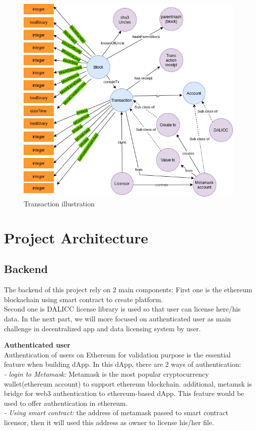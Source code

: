 \begin{itemize}
\begin{center}
\begin{figure}[htb!]
\begin{minipage}{0.75\linewidth}
			\includegraphics[width=1.45\textwidth]{images/chap03_knowledge_graph.png}
		\end{minipage}
		\caption{Transaction illustration}
		
	\end{figure}
	
\end{center}

\end{itemize}
\section{Project Architecture}
\subsection{Backend} The backend of this project rely on 2 main components: First one is the ethereum blockachain using smart contract to create platform. \\
Second one is DALICC license library is used so that user can license here/his data. In the next part, we will more focused on authenticated user as main challenge in decentralized app and data licensing system by user. 

\textbf{Authenticated user} \\
Authentication of users on Ethereum for validation purpose is the essential feature when building dApp. 
In this dApp, there are 2 ways of authentication: \\
\textit{- login to Metamask:} Metamask is the most popular cryptocurrency wallet(ethereum account) to support ethereum blockchain. additional, metamsk is bridge for web3 authentication to ethereum-based dApp. This feature would be used to offer authentication in ethereum.  \\
\textit{- Using smart contract: }the address of metamask passed to smart contract licensor, then it will
used this address as owner to license his/her file. \\

